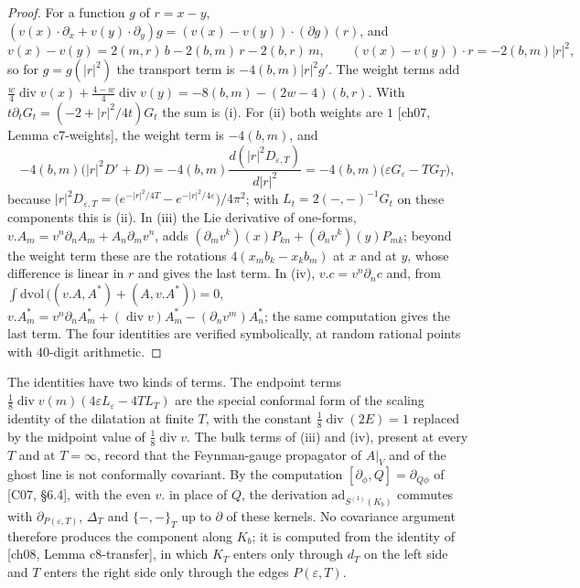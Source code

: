 \begin{proof}
For a function $g$ of $r=x-y$, $(v(x)\cdot\partial_x+v(y)\cdot\partial_y)g=(v(x)-v(y))\cdot(\partial g)(r)$, and
\[
v(x)-v(y)=2(m,r)\,b-2(b,m)\,r-2(b,r)\,m,\qquad (v(x)-v(y))\cdot r=-2(b,m)|r|^2,
\]
so for $g=g(|r|^2)$ the transport term is $-4(b,m)|r|^2g'$. The weight terms add $\tfrac w4\operatorname{div}v(x)+\tfrac{4-w}4\operatorname{div}v(y)=-8(b,m)-(2w-4)(b,r)$. With $t\partial_tG_t=(-2+|r|^2/4t)G_t$ the sum is (i). For (ii) both weights are $1$ [ch07, Lemma c7-weights], the weight term is $-4(b,m)$, and
\[
-4(b,m)\big(|r|^2D'+D\big)=-4(b,m)\frac{d(|r|^2D_{\varepsilon,T})}{d|r|^2}=-4(b,m)\big(\varepsilon G_\varepsilon-TG_T\big),
\]
because $|r|^2D_{\varepsilon,T}=\big(e^{-|r|^2/4T}-e^{-|r|^2/4\varepsilon}\big)/4\pi^2$; with $L_t=2(-,-)^{-1}G_t$ on these components this is (ii). In (iii) the Lie derivative of one-forms, $v.A_m=v^n\partial_nA_m+A_n\partial_mv^n$, adds $(\partial_mv^k)(x)P_{kn}+(\partial_nv^k)(y)P_{mk}$; beyond the weight term these are the rotations $4(x_mb_k-x_kb_m)$ at $x$ and at $y$, whose difference is linear in $r$ and gives the last term. In (iv), $v.c=v^n\partial_nc$ and, from $\int\mathrm{dvol}\,\big((v.A,A^*)+(A,v.A^*)\big)=0$, $v.A^*_m=v^n\partial_nA^*_m+(\operatorname{div}v)A^*_m-(\partial_nv^m)A^*_n$; the same computation gives the last term. The four identities are verified symbolically, at random rational points with $40$-digit arithmetic.
\end{proof}

\begin{remark}
\label{rem:ktr-noninv}
The identities have two kinds of terms. The endpoint terms $\tfrac18\operatorname{div}v(m)(4\varepsilon L_\varepsilon-4TL_T)$ are the special conformal form of the scaling identity of the dilatation at finite $T$, with the constant $\tfrac18\operatorname{div}(2E)=1$ replaced by the midpoint value of $\tfrac18\operatorname{div}v$. The bulk terms of (iii) and (iv), present at every $T$ and at $T=\infty$, record that the Feynman-gauge propagator of $A|_V$ and of the ghost line is not conformally covariant. By the computation $[\partial_\phi,Q]=\partial_{Q\phi}$ of [C07, §6.4], with the even $v.$ in place of $Q$, the derivation $\mathrm{ad}_{S^{(1)}(K_b)}$ commutes with $\partial_{P(\varepsilon,T)}$, $\Delta_T$ and $\{-,-\}_T$ up to $\partial$ of these kernels. No covariance argument therefore produces the component along $K_b$; it is computed from the identity of [ch08, Lemma c8-transfer], in which $K_T$ enters only through $d_T$ on the left side and $T$ enters the right side only through the edges $P(\varepsilon,T)$.
\end{remark}

